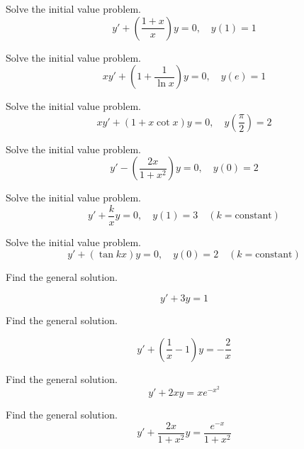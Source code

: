 \documentclass{ximera}
\begin{document}
 \begin{problem}\label{exer:2.1.6} Solve
the initial value problem.
$$y'+\left(\frac{1+x}{x}\right)y=0,\quad y(1)=1$$
\end{problem}

\begin{problem}\label{exer:2.1.7} Solve
the initial value problem.
$$xy'+\left(1+\frac{1}{\ln x}\right)y=0,\quad y(e)=1$$
\end{problem}

\begin{problem}\label{exer:2.1.8} Solve
the initial value problem.
$$xy'+(1+ x\cot x)y=0,\quad y\left(\frac{\pi}{2}
\right)=2$$
\end{problem}

\begin{problem}\label{exer:2.1.9} Solve
the initial value problem.
$$y'-\left(\frac{2x}{1+x^2}\right)y=0,\quad y(0)=2$$
\end{problem}

\begin{problem}\label{exer:2.1.10} Solve
the initial value problem.
$$y'+\frac{k}{x}y=0,\quad y(1)=3 \quad (k=
\mbox{constant})$$
\end{problem}

\begin{problem}\label{exer:2.1.11} Solve
the initial value problem.
$$y'+(\tan kx)y=0,\quad y(0)=2 \quad (k= \mbox{constant})$$
\end{problem}


\begin{problem}\label{exer:2.1.12} Find
the general solution. 

$$y'+3y=1$$


\end{problem}

\begin{problem}\label{exer:2.1.13} Find
the general solution. 

$$y'+\left(\frac{1}{x}-1\right)y=-\frac{2}{x}$$

\end{problem}

\begin{problem}\label{exer:2.1.14} Find
the general solution. 
$$y'+2xy=xe^{-x^2}$$

\end{problem}

\begin{problem}\label{exer:2.1.15} Find
the general solution. 
$$y'+\frac{2x}{1+x^2}y=\frac{e^{-x}}{1+x^2}$$


\end{problem}
\end{document}
